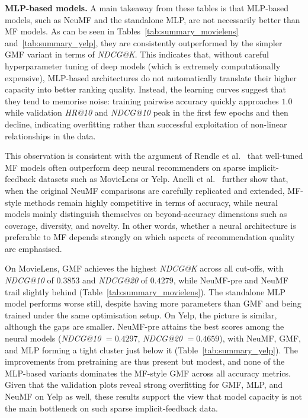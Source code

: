 \documentclass[11pt]{article}
\begin{document}
\textbf{MLP-based models.} A main takeaway from these tables is that MLP-based models, such as NeuMF and the standalone MLP, are not necessarily better than MF models. As can be seen in Tables~\ref{tab:summary_movielens} and~\ref{tab:summary_yelp}, they are consistently outperformed by the simpler GMF variant in terms of \emph{NDCG@K}. This indicates that, without careful hyperparameter tuning of deep models (which is extremely computationally expensive), MLP-based architectures do not automatically translate their higher capacity into better ranking quality. Instead, the learning curves suggest that they tend to memorise noise: training pairwise accuracy quickly approaches $1.0$ while validation \emph{HR@10} and \emph{NDCG@10} peak in the first few epochs and then decline, indicating overfitting rather than successful exploitation of non-linear relationships in the data.

This observation is consistent with the argument of Rendle et al.~\cite{rendle2020neural} that well-tuned MF models often outperform deep neural recommenders on sparse implicit-feedback datasets such as MovieLens or Yelp. Anelli et al.~\cite{anelli2021reenvisioning} further show that, when the original NeuMF comparisons are carefully replicated and extended, MF-style methods remain highly competitive in terms of accuracy, while neural models mainly distinguish themselves on beyond-accuracy dimensions such as coverage, diversity, and novelty. In other words, whether a neural architecture is preferable to MF depends strongly on which aspects of recommendation quality are emphasised.

On MovieLens, GMF achieves the highest \emph{NDCG@K} across all cut-offs, with \emph{NDCG@10} of $0.3853$ and \emph{NDCG@20} of $0.4279$, while NeuMF-pre and NeuMF trail slightly behind (Table~\ref{tab:summary_movielens}). The standalone MLP model performs worse still, despite having more parameters than GMF and being trained under the same optimisation setup. On Yelp, the picture is similar, although the gaps are smaller. NeuMF-pre attains the best scores among the neural models (\emph{NDCG@10} $= 0.4297$, \emph{NDCG@20} $= 0.4659$), with NeuMF, GMF, and MLP forming a tight cluster just below it (Table~\ref{tab:summary_yelp}). The improvements from pretraining are thus present but modest, and none of the MLP-based variants dominates the MF-style GMF across all accuracy metrics. Given that the validation plots reveal strong overfitting for GMF, MLP, and NeuMF on Yelp as well, these results support the view that model capacity is not the main bottleneck on such sparse implicit-feedback data.
\end{document}
